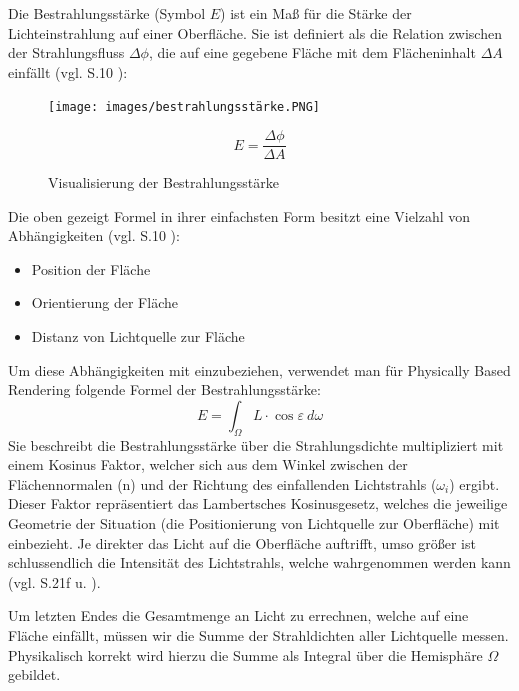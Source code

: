\documentclass[
  11pt,
  a4paper,
  oneside
  ]{article}
\begin{document}
Die Bestrahlungsstärke (Symbol $E$) ist ein Maß für die Stärke der Lichteinstrahlung auf einer Oberfläche. Sie ist definiert als die Relation zwischen der Strahlungsfluss $\Delta \phi$, die auf eine gegebene Fläche mit dem Flächeninhalt $\Delta A$ einfällt 
(vgl. S.10 \cite{GrundlagenLichtTechnik}):
\begin{figure}[H]
  \centering
  \begin{minipage}{.5\textwidth}
    \centering
    \texttt{[image: images/bestrahlungsstärke.PNG]}
    \caption{Visualisierung der Bestrahlungsstärke}
    \label{fig:bestrahlungsstaerke}
  \end{minipage}%
  \hfill
  \begin{minipage}{.5\textwidth}
    \begin{equation}
      E=\dfrac{\Delta \phi}{\Delta A}
    \end{equation}
  \end{minipage}
\end{figure}

Die oben gezeigt Formel in ihrer einfachsten Form besitzt eine Vielzahl von Abhängig\-keiten (vgl. S.10 \cite{GrundlagenLichtTechnik}):
\begin{itemize}
  \item Position der Fläche
  \item Orientierung der Fläche
  \item Distanz von Lichtquelle zur Fläche
\end{itemize}

Um diese Abhängigkeiten mit einzubeziehen, verwendet man für Physically Based Rendering folgende Formel der Bestrahlungsstärke: 
\begin{equation}
  E=\int _{\Omega }L\cdot \cos \varepsilon \ d\omega
\end{equation}
Sie beschreibt die Bestrahlungsstärke über die Strahlungsdichte multipliziert mit einem Kosinus Faktor, welcher sich aus dem Winkel zwischen der Flächennormalen (n) und der Richtung des einfallenden Lichtstrahls ($\omega_{i}$) ergibt. Dieser Faktor repräsentiert das Lambertsches Kosinusgesetz, welches die jeweilige Geometrie der Situation (die Positionierung von Lichtquelle zur Oberfläche) mit einbezieht. Je direkter das Licht auf die Oberfläche auftrifft, umso größer ist schlussendlich die Intensität des Lichtstrahls, welche wahrgenommen werden kann 
(vgl. S.21f \cite{GRAY197813} u. \cite{Ryer97lightmeasurement,renderingEquationArticle}).

Um letzten Endes die Gesamtmenge an Licht zu errechnen, welche auf eine Fläche einfällt, müssen wir die Summe der Strahldichten aller Lichtquelle messen. Physikalisch korrekt wird hierzu die Summe als Integral über die Hemisphäre $\Omega$ gebildet. 
\end{document}

